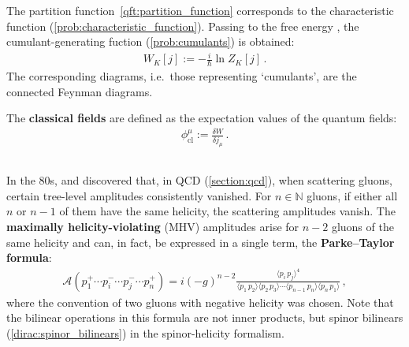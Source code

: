     \begin{property}
        The partition function~\eqref{qft:partition_function} corresponds to the characteristic function (\cref{prob:characteristic_function}). Passing to the free energy , the cumulant-generating fuction (\cref{prob:cumulants}) is obtained:
        \begin{gather}
            W_K[j] := -\frac{i}{\hbar}\ln Z_K[j]\,.
        \end{gather}
        The corresponding diagrams, i.e.~those representing `cumulants', are the connected Feynman diagrams.
    \end{property}

    The \textbf{classical fields} are defined as the expectation values of the quantum fields:
    \begin{gather}
        \phi^\mu_{\text{cl}} := \frac{\delta W}{\delta j_\mu}\,.
    \end{gather}


    

\subsection{}

    In the 80s,  and  discovered that, in QCD (\cref{section:qcd}), when scattering gluons, certain tree-level amplitudes consistently vanished. For $n\in\mathbb{N}$ gluons, if either all $n$ or $n-1$ of them have the same helicity, the scattering amplitudes vanish. The \textbf{maximally helicity-violating} (MHV) amplitudes arise for $n-2$ gluons of the same helicity and can, in fact, be expressed in a single term, the \textbf{Parke--Taylor formula}:
    \begin{gather}
        \mathcal{A}(p_1^+\cdots p_i^-\cdots p_j^-\cdots p_n^+) = i(-g)^{n-2}\frac{\langle p_i\,p_j\rangle^4}{\langle p_1\,p_2\rangle\langle p_2\,p_3\rangle\cdots\langle p_{n-1}\,p_n\rangle\langle p_n\,p_1\rangle}\,,
    \end{gather}
    where the convention of two gluons with negative helicity was chosen. Note that the bilinear operations in this formula are not inner products, but spinor bilinears (\cref{dirac:spinor_bilinears}) in the spinor-helicity formalism.


